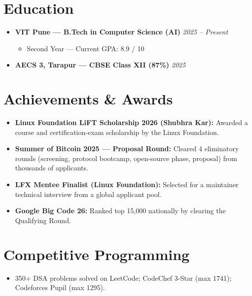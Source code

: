 \documentclass[letterpaper,10.5pt]{article}
\newcommand{\resumeItem}[1]{
  \item\small{#1}
}
\newcommand{\resumeSubheading}[2]{
  \item[]
    \textbf{#1} \hfill \small\textit{#2}
}
\begin{document}
\section{Education}
\begin{itemize}
  \resumeSubheading{VIT Pune --- B.Tech in Computer Science (AI)}{2025 -- Present}
  \begin{itemize}
    \resumeItem{Second Year --- Current GPA: 8.9 / 10}
  \end{itemize}
  \resumeSubheading{AECS 3, Tarapur --- CBSE Class XII (87\%)}{2025}
\end{itemize}

\section{Achievements \& Awards}
\begin{itemize}
  \resumeItem{\textbf{Linux Foundation LiFT Scholarship 2026 (Shubhra Kar):} Awarded a course and certification-exam scholarship by the Linux Foundation.}
  \resumeItem{\textbf{Summer of Bitcoin 2025 --- Proposal Round:} Cleared 4 eliminatory rounds (screening, protocol bootcamp, open-source phase, proposal) from thousands of applicants.}
  \resumeItem{\textbf{LFX Mentee Finalist (Linux Foundation):} Selected for a maintainer technical interview from a global applicant pool.}
  \resumeItem{\textbf{Google Big Code 26:} Ranked top 15,000 nationally by clearing the Qualifying Round.}
\end{itemize}

\section{Competitive Programming}
\begin{itemize}
  \resumeItem{350+ DSA problems solved on LeetCode; CodeChef 3-Star (max 1741); Codeforces Pupil (max 1295).}
\end{itemize}
\end{document}
